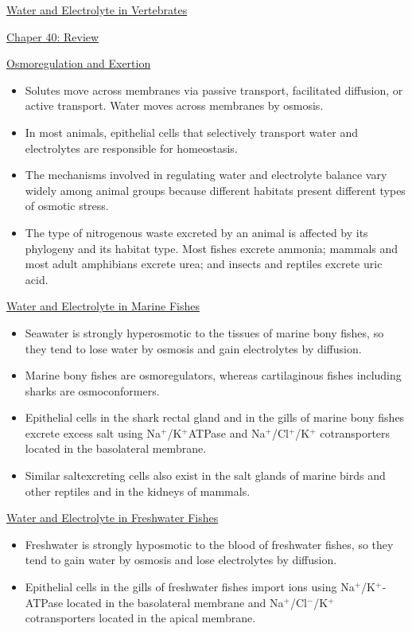 \documentclass[12pt,letterpaper]{article}
\begin{document}
\begin{secbox}{\hyperlink{40}{Water and Electrolyte in Vertebrates}}
{\hypertarget{40.r}{}
    \begin{probbox}{\hyperlink{40}{Chaper 40: Review}}\end{probbox}
        \hyperlink{40.1}{Osmoregulation and Exertion}
        \begin{itemize}
            \item Solutes move across membranes via passive transport, facilitated diffusion, or active transport. Water moves across membranes by osmosis. 
            \item In most animals, epithelial cells that selectively transport water and electrolytes are responsible for homeostasis. 
            \item The mechanisms involved in regulating water and electrolyte balance vary widely among animal groups because different habitats present different types of osmotic stress.
            \item The type of nitrogenous waste excreted by an animal is affected by its phylogeny and its habitat type. Most fishes excrete ammonia; mammals and most adult amphibians excrete urea; and insects and reptiles excrete uric acid.
        \end{itemize}
        \hyperlink{40.2}{Water and Electrolyte in Marine Fishes}
        \begin{itemize}
            \item Seawater is strongly hyperosmotic to the tissues of marine bony fishes, so they tend to lose water by osmosis and gain electrolytes by diffusion. 
            \item Marine bony fishes are osmoregulators, whereas cartilaginous fishes including sharks are osmoconformers. 
            \item Epithelial cells in the shark rectal gland and in the gills of marine bony fishes excrete excess salt using Na\(^+\)/K\(^+\)­ATPase and Na\(^+\)/Cl\(^+\)/K\(^+\) cotransporters located in the basolateral membrane. 
            \item Similar salt­excreting cells also exist in the salt glands of marine birds and other reptiles and in the kidneys of mammals.
        \end{itemize}
        \hyperlink{40.3}{Water and Electrolyte in Freshwater Fishes}
        \begin{itemize}
            \item Freshwater is strongly hyposmotic to the blood of freshwater fishes, so they tend to gain water by osmosis and lose electrolytes by diffusion. 
            \item Epithelial cells in the gills of freshwater fishes import ions using Na\(^+\)/K\(^+\)­ATPase located in the basolateral membrane and Na\(^+\)/Cl\(^-\)/K\(^+\) cotransporters located in the apical membrane.

\end{itemize}}
\end{secbox}
\end{document}
